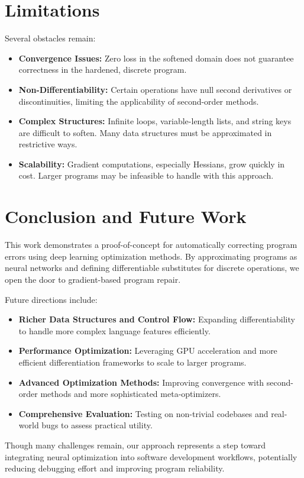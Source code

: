 \documentclass{article}
\begin{document}
\section{Limitations}
Several obstacles remain:
\begin{itemize}[leftmargin=*]
    \item \textbf{Convergence Issues:} Zero loss in the softened domain does not guarantee correctness in the hardened, discrete program.
    \item \textbf{Non-Differentiability:} Certain operations have null second derivatives or discontinuities, limiting the applicability of second-order methods.
    \item \textbf{Complex Structures:} Infinite loops, variable-length lists, and string keys are difficult to soften. Many data structures must be approximated in restrictive ways.
    \item \textbf{Scalability:} Gradient computations, especially Hessians, grow quickly in cost. Larger programs may be infeasible to handle with this approach.
\end{itemize}

\section{Conclusion and Future Work}
This work demonstrates a proof-of-concept for automatically correcting program errors using deep learning optimization methods. By approximating programs as neural networks and defining differentiable substitutes for discrete operations, we open the door to gradient-based program repair.

Future directions include:
\begin{itemize}[leftmargin=*]
    \item \textbf{Richer Data Structures and Control Flow:} Expanding differentiability to handle more complex language features efficiently.
    \item \textbf{Performance Optimization:} Leveraging GPU acceleration and more efficient differentiation frameworks to scale to larger programs.
    \item \textbf{Advanced Optimization Methods:} Improving convergence with second-order methods and more sophisticated meta-optimizers.
    \item \textbf{Comprehensive Evaluation:} Testing on non-trivial codebases and real-world bugs to assess practical utility.
\end{itemize}

Though many challenges remain, our approach represents a step toward integrating neural optimization into software development workflows, potentially reducing debugging effort and improving program reliability.



\end{document}
